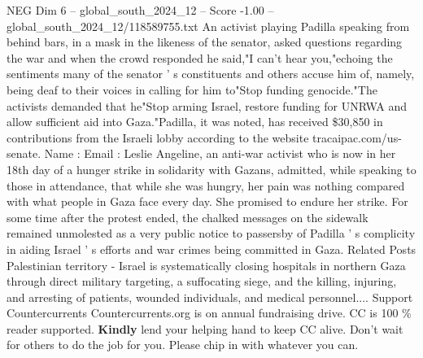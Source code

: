 \begin{textsample}{NEG Dim 6 – global\_south\_2024\_12 – Score -1.00 – global\_south\_2024\_12/118589755.txt}
An activist playing Padilla speaking from behind bars, in a mask in the likeness of the senator, asked questions regarding the war and when the crowd responded he said,"I can't hear you,"echoing the sentiments many of the senator ' s constituents and others accuse him of, namely, being deaf to their voices in calling for him to"Stop funding genocide."The activists demanded that he"Stop arming Israel, restore funding for UNRWA and allow sufficient aid into Gaza."Padilla, it was noted, has received \$30,850 in contributions from the Israeli lobby according to the website tracaipac.com/us-senate.
Name : Email : Leslie Angeline, an anti-war activist who is now in her 18th day of a hunger strike in solidarity with Gazans, admitted, while speaking to those in attendance, that while she was hungry, her pain was nothing compared with what people in Gaza face every day.
She promised to endure her strike.
For some time after the protest ended, the chalked messages on the sidewalk remained unmolested as a very public notice to passersby of Padilla ' s complicity in aiding Israel ' s efforts and war crimes being committed in Gaza.
Related Posts Palestinian territory - Israel is systematically closing hospitals in northern Gaza through direct military targeting, a suffocating siege, and the killing, injuring, and arresting of patients, wounded individuals, and medical personnel....
Support Countercurrents Countercurrents.org is on annual fundraising drive.
CC is 100 \% reader supported. \textbf{Kindly} lend your helping hand to keep CC alive.
Don't wait for others to do the job for you.
Please chip in with whatever you can.

\end{textsample}
